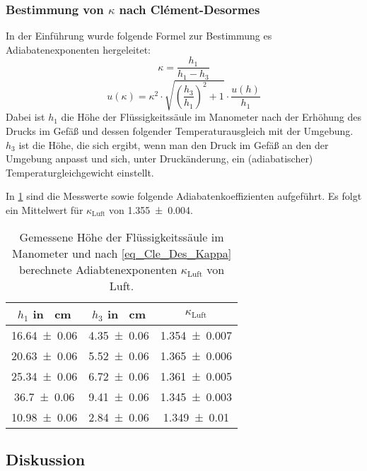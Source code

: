 \documentclass[
	a4paper,
	12pt,
	pagesize,
	ngerman
]{scrartcl}
\begin{document}
	
	
	\subsubsection{Bestimmung von $\kappa$ nach Clément-Desormes}
	In der Einführung wurde folgende Formel zur Bestimmung es Adiabatenexponenten hergeleitet:
	\begin{equation}
		\kappa = \frac{h_1}{h_1-h_3}
		\label{eq_Cle_Des_Kappa}
	\end{equation}
	\begin{equation}	
		u(\kappa) = \kappa^2\cdot \sqrt{\left(\frac{h_3}{h_1}\right)^2+1} \cdot \frac{u(h)}{h_1}
	\end{equation}
	Dabei ist $h_1$ die Höhe der Flüssigkeitssäule im Manometer nach der Erhöhung des Drucks im Gefäß und dessen folgender Temperaturausgleich mit der Umgebung. 
	$h_3$ ist die Höhe, die sich ergibt, wenn man den Druck im Gefäß an den der Umgebung anpasst und sich, unter Druckänderung, ein (adiabatischer) Temperaturgleichgewicht einstellt.
	
	In \cref{tab_Manometer} sind die Messwerte sowie folgende Adiabatenkoeffizienten aufgeführt. Es folgt ein Mittelwert für $\kappa_\text{Luft}$ von \SI{1,355+-0,004}{}.
	\begin{table}[H]
		\centering
		\begin{tabular}{ c | c | c }
			$h_1$ in \SI{}{cm} & $h_3$ in \SI{}{cm}  & $\kappa_\text{Luft}$\\ \hline
			\SI{16,64+-0,06}{}&\SI{4,35+-0,06}{} & \SI{1,354+-0,007}{}\\
			\SI{20,63+-0,06}{}&\SI{5,52+-0,06}{}& \SI{1,365+-0,006}{}\\
			\SI{25,34+-0,06}{}&\SI{6,72+-0,06}{}& \SI{1,361+-0,005}{}\\
			\SI{36,7+-0,06}{}&\SI{9,41+-0,06}{}& \SI{1,345+-0,003}{}\\
			\SI{10,98+-0,06}{}&\SI{2,84+-0,06}{}& \SI{1,349+-0,01}{}\\
		\end{tabular}
		\caption{Gemessene Höhe der Flüssigkeitssäule im Manometer und nach \cref{eq_Cle_Des_Kappa} berechnete Adiabtenexponenten $\kappa_\text{Luft}$ von Luft.}
		\label{tab_Manometer} 
	\end{table}
	\subsection{Diskussion}
	
\end{document}
